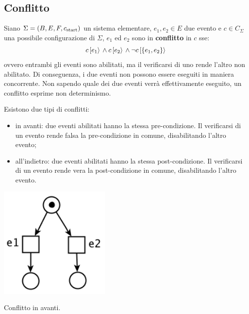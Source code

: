 \subsection{Conflitto}
\begin{defn}
    Siano $\Sigma = (B, E, F, c_{\textnormal{start}})$ un sistema elementare, $e_1, e_2 \in E$ due evento e $c \in C_{\Sigma}$ una possibile configurazione di $\Sigma$, $e_1$ ed $e_2$ sono in \textbf{conflitto} in $c$ sse:
    \[
        c\,[e_1\rangle\, \land c\,[e_2\rangle\, \land \lnot c\,[\left\{e_1, e_2\right\}\rangle\,
    \]
    ovvero entrambi gli eventi sono abilitati, ma il verificarsi di uno rende l'altro non abilitato.
    Di conseguenza, i due eventi non possono essere eseguiti in maniera concorrente.
    Non sapendo quale dei due eventi verrà effettivamente eseguito, un conflitto esprime non determinismo.

    Esistono due tipi di conflitti:
    \begin{itemize}
        \item in avanti: due eventi abilitati hanno la stessa pre-condizione. Il verificarsi di un evento rende falsa la pre-condizione in comune, disabilitando l'altro evento;
        \item all'indietro: due eventi abilitati hanno la stessa post-condizione. Il verificarsi di un evento rende vera la post-condizione in comune, disabilitando l'altro evento.
    \end{itemize}

    \begin{marginfigure}[-11cm]
        \includegraphics[width=0.75\linewidth]{img/conflitto_avanti.png}
    \caption{Conflitto in avanti.}
    \label{fig:conflitto_avanti}
    \end{marginfigure}


\end{defn}
